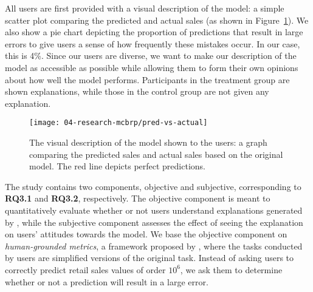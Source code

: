All users are first provided with a visual description of the model: a simple scatter plot comparing the predicted and actual sales (as shown in Figure~\ref{fig:pred}). 
We also show a pie chart depicting the proportion of predictions that result in large errors to give users a sense of how frequently these mistakes occur. 
In our case, this is 4\%. 
Since our users are diverse, we want to make our description of the model as accessible as possible while allowing them to form their own opinions about how well the model performs. 
Participants in the treatment group are shown \OurMethod{} explanations, while those in the control group are not given any explanation. 








\begin{figure}[t]
\centering
\texttt{[image: 04-research-mcbrp/pred-vs-actual]}
\caption{The visual description of the model shown to the users: a graph comparing the predicted sales and actual sales based on the original model. The red line depicts perfect predictions.}
\label{fig:pred}
\vspace*{-.5\baselineskip}
\end{figure}

The study contains two components, objective and subjective, corresponding to \textbf{RQ3.1} and \textbf{RQ3.2}, respectively. 
The objective component is meant to quantitatively evaluate whether or not users understand explanations generated by \OurMethod{}, while the subjective component assesses the effect of seeing the explanation on users' attitudes towards the model. 
We base the objective component on \textit{human-grounded metrics}, a framework proposed by \citet{doshi-2017-towards}, where the tasks conducted by users are simplified versions of the original task. 
Instead of asking users to correctly predict retail sales values of order $10^6$, we ask them to determine whether or not a prediction will result in a large error. 

